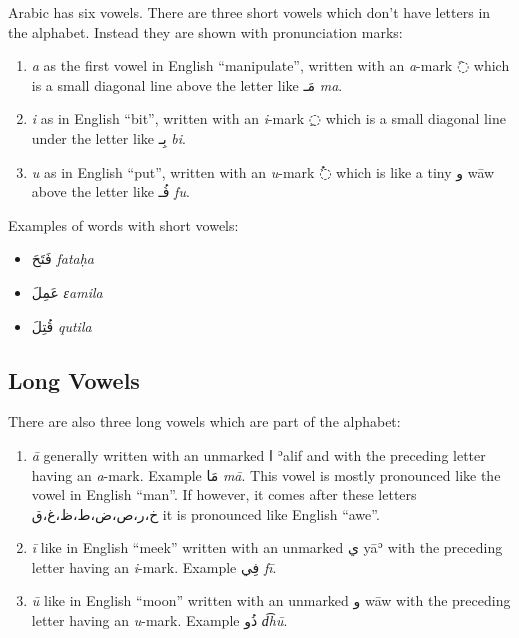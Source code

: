 \documentclass[
  10pt,
]{book}
\providecommand{\tightlist}{%
  \setlength{\itemsep}{0pt}\setlength{\parskip}{0pt}}
\begin{document}
Arabic has six vowels. There are three short vowels which don't have letters in the alphabet. Instead they are shown with pronunciation marks:

\begin{enumerate}
\def\labelenumi{\arabic{enumi}.}
\tightlist
\item
  \emph{a} as the first vowel in English \enquote{manipulate}, written with an \emph{a}-mark \foreignlanguage{arabic}{◌َ} which is a small diagonal line above the letter like \foreignlanguage{arabic}{مَـ} \emph{ma}.
\item
  \emph{i} as in English \enquote{bit}, written with an \emph{i}-mark \foreignlanguage{arabic}{◌ِ} which is a small diagonal line under the letter like \foreignlanguage{arabic}{بِـ} \emph{bi}.
\item
  \emph{u} as in English \enquote{put}, written with an \emph{u}-mark \foreignlanguage{arabic}{◌ُ} which is like a tiny \foreignlanguage{arabic}{و} wāw above the letter like \foreignlanguage{arabic}{فُـ} \emph{fu}.
\end{enumerate}

Examples of words with short vowels:

\begin{itemize}
\tightlist
\item
  \foreignlanguage{arabic}{فَتَحَ} \emph{fataḥa}
\item
  \foreignlanguage{arabic}{عَمِلَ} \emph{ɛamila}
\item
  \foreignlanguage{arabic}{قُتِلَ} \emph{qutila}
\end{itemize}

\subsection{Long Vowels}\label{long-vowels}

There are also three long vowels which are part of the alphabet:

\begin{enumerate}
\def\labelenumi{\arabic{enumi}.}
\tightlist
\item
  \emph{ā} generally written with an unmarked \foreignlanguage{arabic}{ا} ʾalif and with the preceding letter having an \emph{a}-mark. Example \foreignlanguage{arabic}{مَا} \emph{mā}. This vowel is mostly pronounced like the vowel in English \enquote{man}. If however, it comes after these letters \foreignlanguage{arabic}{خ،ر،ص،ض،ط،ظ،غ،ق} it is pronounced like English \enquote{awe}.
\item
  \emph{ī} like in English \enquote{meek} written with an unmarked \foreignlanguage{arabic}{ي} yāʾ with the preceding letter having an \emph{i}-mark. Example \foreignlanguage{arabic}{فِي} \emph{fī}.
\item
  \emph{ū} like in English \enquote{moon} written with an unmarked \foreignlanguage{arabic}{و} wāw with the preceding letter having an \emph{u}-mark. Example \foreignlanguage{arabic}{ذُو} \emph{d͡hū}.
\end{enumerate}
\end{document}
